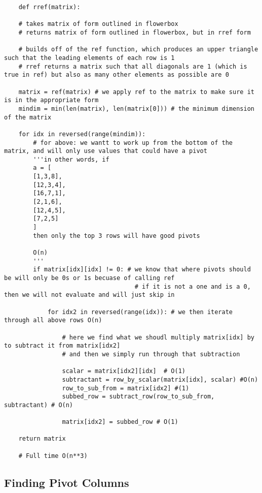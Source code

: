 \documentclass[12pt, a4paper]{article}
\begin{document}
\begin{lstlisting}
    def rref(matrix):

    # takes matrix of form outlined in flowerbox
    # returns matrix of form outlined in flowerbox, but in rref form

    # builds off of the ref function, which produces an upper triangle such that the leading elements of each row is 1
    # rref returns a matrix such that all diagonals are 1 (which is true in ref) but also as many other elements as possible are 0

    matrix = ref(matrix) # we apply ref to the matrix to make sure it is in the appropriate form
    mindim = min(len(matrix), len(matrix[0])) # the minimum dimension of the matrix

    for idx in reversed(range(mindim)): 
        # for above: we wantt to work up from the bottom of the matrix, and will only use values that could have a pivot
        '''in other words, if 
        a = [
        [1,3,8],
        [12,3,4],
        [16,7,1],
        [2,1,6],
        [12,4,5],
        [7,2,5]
        ]
        then only the top 3 rows will have good pivots

        O(n)
        '''
        if matrix[idx][idx] != 0: # we know that where pivots should be will only be 0s or 1s becuase of calling ref
                                    # if it is not a one and is a 0, then we will not evaluate and will just skip in
  
            for idx2 in reversed(range(idx)): # we then iterate through all above rows O(n)
                
                # here we find what we shoudl multiply matrix[idx] by to subtract it from matrix[idx2]
                # and then we simply run through that subtraction
         
                scalar = matrix[idx2][idx]  # O(1)
                subtractant = row_by_scalar(matrix[idx], scalar) #O(n)
                row_to_sub_from = matrix[idx2] #(1)
                subbed_row = subtract_row(row_to_sub_from, subtractant) # O(n)
    
                matrix[idx2] = subbed_row # O(1)
    
    return matrix

    # Full time O(n**3)
\end{lstlisting}

\subsection{Finding Pivot Columns}
\end{document}
